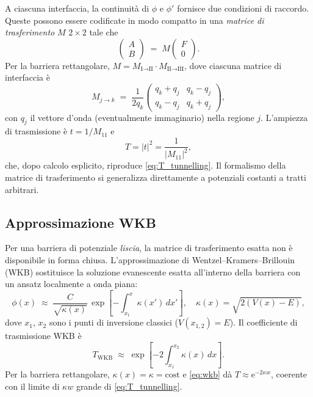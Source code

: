 \documentclass[12pt, a4paper]{article}
\newcommand{\ee}{\mathrm{e}}          %
\begin{document}
A ciascuna interfaccia, la continuità di $\phi$ e $\phi'$ fornisce due
condizioni di raccordo. Queste possono essere codificate in modo compatto
in una \emph{matrice di trasferimento} $M$ $2\times 2$ tale che
\begin{equation}
  \begin{pmatrix} A \\ B \end{pmatrix}
  \;=\; M \begin{pmatrix} F \\ 0 \end{pmatrix}.
\end{equation}
Per la barriera rettangolare, $M = M_{\text{I}\to\text{II}}\cdot
M_{\text{II}\to\text{III}}$, dove ciascuna matrice di interfaccia è
\begin{equation}
  M_{j\to k} \;=\; \frac{1}{2q_k}
  \begin{pmatrix}
    q_k + q_j & q_k - q_j \\
    q_k - q_j & q_k + q_j
  \end{pmatrix},
\end{equation}
con $q_j$ il vettore d'onda (eventualmente immaginario) nella regione $j$.
L'ampiezza di trasmissione è $t = 1/M_{11}$ e
\begin{equation}
  T = |t|^2 = \frac{1}{|M_{11}|^2},
\end{equation}
che, dopo calcolo esplicito, riproduce \eqref{eq:T_tunnelling}.
Il formalismo della matrice di trasferimento si generalizza direttamente
a potenziali costanti a tratti arbitrari.

\subsection{Approssimazione WKB}

Per una barriera di potenziale \emph{liscia}, la matrice di trasferimento
esatta non è disponibile in forma chiusa. L'approssimazione di
Wentzel--Kramers--Brillouin (WKB) sostituisce la soluzione evanescente
esatta all'interno della barriera con un ansatz localmente a onda piana:
\begin{equation}
  \phi(x) \;\approx\;
  \frac{C}{\sqrt{\kappa(x)}}\,\exp\!\left[-\int_{x_1}^{x}\kappa(x')\,dx'\right],
  \quad \kappa(x) = \sqrt{2(V(x)-E)},
\end{equation}
dove $x_1$, $x_2$ sono i punti di inversione classici ($V(x_{1,2}) = E$).
Il coefficiente di trasmissione WKB è
\begin{equation}
  T_\text{WKB} \;\approx\; \exp\!\left[-2\int_{x_1}^{x_2}\kappa(x)\,dx\right].
  \label{eq:wkb}
\end{equation}
Per la barriera rettangolare, $\kappa(x) = \kappa = \text{cost}$ e
\eqref{eq:wkb} dà $T \approx \ee^{-2\kappa w}$, coerente con il limite
di $\kappa w$ grande di \eqref{eq:T_tunnelling}.
\end{document}
